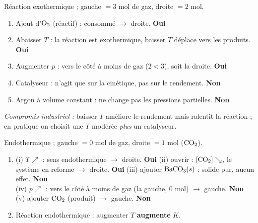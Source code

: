 \documentclass[11pt,a4paper]{article}
\newcommand{\rep}[1]{\textcolor{primarydark}{\textbf{#1}}}
\newcommand{\oui}{\textcolor{excol}{\textbf{Oui}}}
\newcommand{\non}{\textcolor{attncol}{\textbf{Non}}}
\begin{document}
\begin{correction}
Réaction exothermique ; gauche $=3$ mol de gaz, droite $=2$ mol.
\begin{enumerate}[label=\alph*),leftmargin=2em,topsep=2pt,itemsep=2pt]
  \item Ajout d'$\ce{O2}$ (réactif) : consommé $\to$ droite. \oui
  \item Abaisser $T$ : la réaction est exothermique, baisser $T$ déplace vers les produits. \oui
  \item Augmenter $p$ : vers le côté à moins de gaz ($2<3$), soit la droite. \oui
  \item Catalyseur : n'agit que sur la cinétique, pas sur le rendement. \non
  \item Argon à volume constant : ne change pas les pressions partielles. \non
\end{enumerate}
\emph{Compromis industriel :} baisser $T$ améliore le rendement mais ralentit la réaction ; en pratique on
choisit une $T$ modérée \emph{plus} un catalyseur.
\end{correction}

\begin{correction}
Endothermique ; gauche $=0$ mol de gaz, droite $=1$ mol ($\ce{CO2}$).
\begin{enumerate}[label=\alph*),leftmargin=2em,topsep=2pt,itemsep=2pt]
  \item (i) $T\nearrow$ : sens endothermique $\to$ droite. \oui \quad
        (ii) ouvrir : $[\ce{CO2}]\searrow$, le système en reforme $\to$ droite. \oui \quad
        (iii) ajouter $\ce{BaCO3}(s)$ : solide pur, aucun effet. \non \\
        (iv) $p\nearrow$ : vers le côté à moins de gaz (la gauche, $0$ mol) $\to$ gauche. \non \quad
        (v) ajouter $\ce{CO2}$ (produit) $\to$ gauche. \non
  \item Réaction endothermique : augmenter $T$ \rep{augmente} $K$.
\end{enumerate}
\end{correction}
\end{document}
